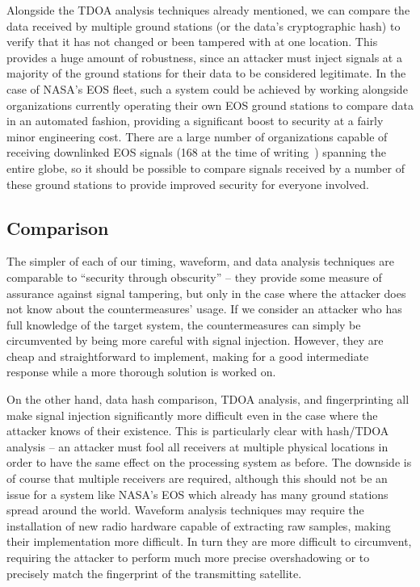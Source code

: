 
Alongside the TDOA analysis techniques already mentioned, we can compare the data received by multiple ground stations (or the data's cryptographic hash) to verify that it has not changed or been tampered with at one location.
This provides a huge amount of robustness, since an attacker must inject signals at a majority of the ground stations for their data to be considered legitimate.
In the case of NASA's EOS fleet, such a system could be achieved by working alongside organizations currently operating their own EOS ground stations to compare data in an automated fashion, providing a significant boost to security at a fairly minor engineering cost.
There are a large number of organizations capable of receiving downlinked EOS signals (168 at the time of writing~\cite{nasaDirect}) spanning the entire globe, so it should be possible to compare signals received by a number of these ground stations to provide improved security for everyone involved.


\subsection{Comparison}

The simpler of each of our timing, waveform, and data analysis techniques are comparable to ``security through obscurity'' -- they provide some measure of assurance against signal tampering, but only in the case where the attacker does not know about the countermeasures' usage.
If we consider an attacker who has full knowledge of the target system, the countermeasures can simply be circumvented by being more careful with signal injection.
However, they are cheap and straightforward to implement, making for a good intermediate response while a more thorough solution is worked on.

On the other hand, data hash comparison, TDOA analysis, and fingerprinting all make signal injection significantly more difficult even in the case where the attacker knows of their existence.
This is particularly clear with hash/TDOA analysis -- an attacker must fool all receivers at multiple physical locations in order to have the same effect on the processing system as before.
The downside is of course that multiple receivers are required, although this should not be an issue for a system like NASA's EOS which already has many ground stations spread around the world.
Waveform analysis techniques may require the installation of new radio hardware capable of extracting raw samples, making their implementation more difficult.
In turn they are more difficult to circumvent, requiring the attacker to perform much more precise overshadowing or to precisely match the fingerprint of the transmitting satellite.

